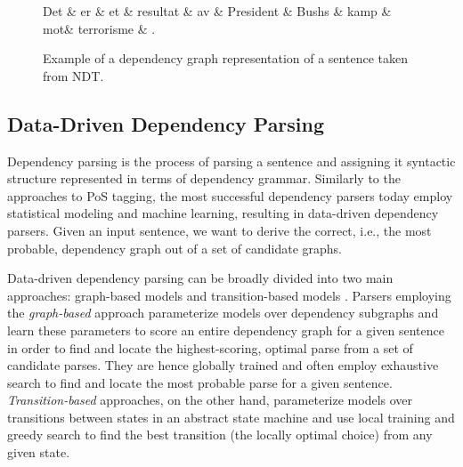 \documentclass[a4paper,12pt,english]{book}
\begin{document}
\begin{figure}
    \smaller[0.5]
    \begin{dependency}[theme = simple]
        \begin{deptext}[column sep=1em]
            Det \& er \& et \& resultat \& av \& President \& Bushs \& kamp \&
            mot\& terrorisme \& . \\
        \end{deptext}
    \end{dependency}
    \caption{Example of a dependency graph representation of a sentence taken
        from NDT.}
    \label{exndt}
\end{figure}

\subsection{Data-Driven Dependency Parsing}
\label{ssec:depparsers}
Dependency parsing is the process of parsing a sentence and assigning it
syntactic structure represented in terms of dependency grammar. Similarly to
the approaches to PoS tagging, the most successful dependency parsers today
employ statistical modeling and machine learning, resulting in data-driven
dependency parsers. Given an input sentence, we want to derive the correct,
i.e., the most probable, dependency graph out of a set of candidate graphs.

Data-driven dependency parsing can be broadly divided into two main approaches:
graph-based models and transition-based models \cite{McD:Niv:11}. Parsers
employing the \emph{graph-based} approach parameterize models over dependency
subgraphs and learn these parameters to score an entire dependency graph for a
given sentence in order to find and locate the highest-scoring, optimal parse
from a set of candidate parses. They are hence globally trained and often
employ exhaustive search to find and locate the most probable parse for a given
sentence. \emph{Transition-based} approaches, on the other hand, parameterize
models over transitions between states in an abstract state machine and use
local training and greedy search to find the best transition (the locally
optimal choice) from any given state.
\end{document}
